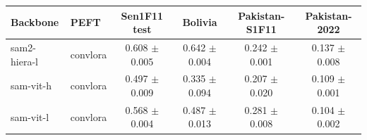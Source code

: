 \begin{tabular}{llcccc}
\toprule
Backbone & PEFT & Sen1F11 test & Bolivia & Pakistan-S1F11 & Pakistan-2022 \\
\midrule
sam2-hiera-l & convlora & 0.608 $\pm$ 0.005 & 0.642 $\pm$ 0.004 & 0.242 $\pm$ 0.001 & 0.137 $\pm$ 0.008 \\
sam-vit-h & convlora & 0.497 $\pm$ 0.009 & 0.335 $\pm$ 0.094 & 0.207 $\pm$ 0.020 & 0.109 $\pm$ 0.001 \\
sam-vit-l & convlora & 0.568 $\pm$ 0.004 & 0.487 $\pm$ 0.013 & 0.281 $\pm$ 0.008 & 0.104 $\pm$ 0.002 \\
\bottomrule
\end{tabular}
